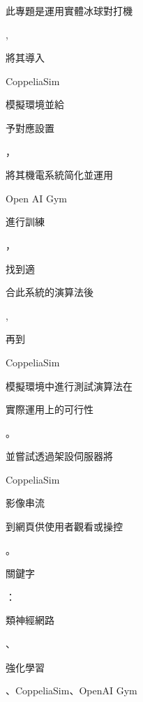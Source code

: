 \documentclass[10pt]{article}
\begin{document}
\begin{CJK}{UTF8}{mj}此專題是運用實體冰球對打機\end{CJK}, \begin{CJK}{UTF8}{mj}將其導入\end{CJK} CoppeliaSim \begin{CJK}{UTF8}{mj}模擬環境並給\end{CJK} \begin{CJK}{UTF8}{mj}予對應設置\end{CJK}，\begin{CJK}{UTF8}{mj}將其機電系統简化並運用\end{CJK} Open AI Gym \begin{CJK}{UTF8}{mj}進行訓練\end{CJK}，\begin{CJK}{UTF8}{mj}找到適\end{CJK} \begin{CJK}{UTF8}{mj}合此系統的演算法後\end{CJK}, \begin{CJK}{UTF8}{mj}再到\end{CJK} CoppeliaSim\begin{CJK}{UTF8}{mj}模擬環境中進行測試演算法在\end{CJK} \begin{CJK}{UTF8}{mj}實際運用上的可行性\end{CJK}。\begin{CJK}{UTF8}{mj}並嘗試透過架設伺服器將\end{CJK} CoppeliaSim \begin{CJK}{UTF8}{mj}影像串流\end{CJK} \begin{CJK}{UTF8}{mj}到網頁供使用者觀看或操控\end{CJK}。

\begin{CJK}{UTF8}{mj}關鍵字\end{CJK}：\begin{CJK}{UTF8}{mj}類神經網路\end{CJK}、\begin{CJK}{UTF8}{mj}強化學習\end{CJK}、CoppeliaSim、OpenAI Gym
\end{document}
